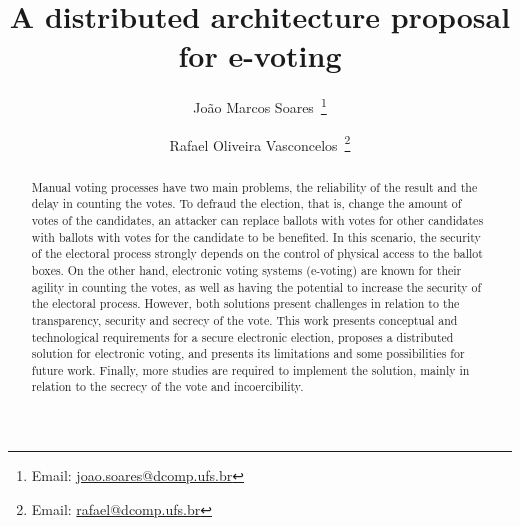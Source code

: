 \documentclass[english]{textolivre}
\title{A distributed architecture proposal for e-voting}
\author[1]{João Marcos Soares~\orcid{0000-0002-5242-3289}\thanks{Email: \href{mailto:joao.soares@dcomp.ufs.br}{joao.soares@dcomp.ufs.br}}}
\author[1]{Rafael Oliveira Vasconcelos~\orcid{0000-0001-7974-304X}\thanks{Email: \href{mailto:rafael@dcomp.ufs.br}{rafael@dcomp.ufs.br}}}
\affil[1]{Universidade Federal de Sergipe, Departamento de Computação, São Cristóvão, SE, Brasil.}
\begin{document}
\maketitle

\begin{polyabstract}

\begin{english}
\begin{abstract}

Manual voting processes have two main problems, the reliability of the result and the delay in counting the votes. To defraud the election, that is, change the amount of votes of the candidates, an attacker can replace ballots with votes for other candidates with ballots with votes for the candidate to be benefited. In this scenario, the security of the electoral process strongly depends on the control of physical access to the ballot boxes. On the other hand, electronic voting systems (e-voting) are known for their agility in counting the votes, as well as having the potential to increase the security of the electoral process. However, both solutions present challenges in relation to the transparency, security and secrecy of the vote. This work presents conceptual and technological requirements for a secure electronic election, proposes a distributed solution for electronic voting, and presents its limitations and some possibilities for future work. Finally, more studies are required to implement the solution, mainly in relation to the secrecy of the vote and incoercibility.



\end{abstract}
\end{english}

\begin{portuguese}
\begin{abstract}


\end{abstract}
\end{portuguese}
\end{polyabstract}
\end{document}
